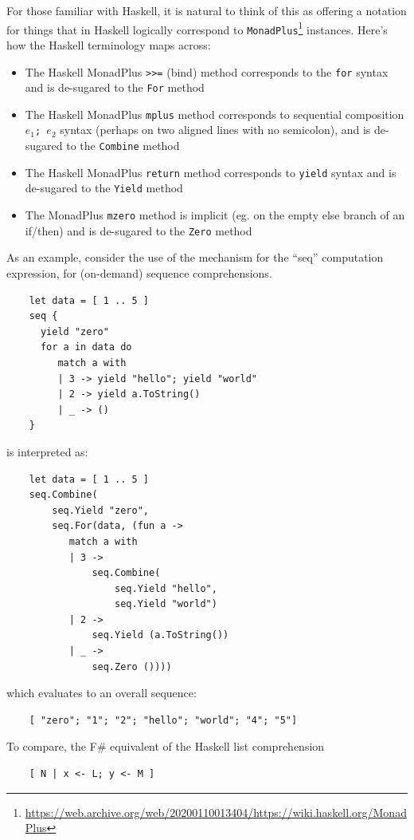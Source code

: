\documentclass[acmsmall]{acmart}\settopmatter{}
\begin{document}
For those familiar with Haskell, it is natural to think of this as offering a notation for things that in Haskell logically
correspond to \texttt{MonadPlus}\footnote{\url{https://web.archive.org/web/20200110013404/https://wiki.haskell.org/MonadPlus}} instances.  Here’s how the Haskell terminology maps across:
\begin{itemize}
\item The Haskell MonadPlus \texttt{>>=} (bind) method corresponds to the \texttt{for} syntax and is de-sugared to the \texttt{For} method

\item The Haskell MonadPlus \texttt{mplus} method corresponds to sequential composition \texttt{$e_1$; $e_2$} syntax (perhaps on two aligned lines with no semicolon), and is de-sugared to the \texttt{Combine} method

\item The Haskell MonadPlus \texttt{return} method corresponds to \texttt{yield} syntax and is de-sugared to the \texttt{Yield} method

\item The MonadPlus \texttt{mzero} method is implicit (eg. on the empty else branch of an if/then) and is de-sugared to the \texttt{Zero} method
\end{itemize}
As an example, consider the use of the mechanism for the “seq” computation expression, for (on-demand) sequence comprehensions. 
\begin{verbatim}
    let data = [ 1 .. 5 ]
    seq {
      yield "zero"
      for a in data do
         match a with
         | 3 -> yield "hello"; yield "world"
         | 2 -> yield a.ToString() 
         | _ -> () 
    }
\end{verbatim}
is interpreted as:
\begin{verbatim}
    let data = [ 1 .. 5 ]
    seq.Combine(
        seq.Yield "zero",
        seq.For(data, (fun a ->
           match a with
           | 3 -> 
               seq.Combine(
                   seq.Yield "hello", 
                   seq.Yield "world")
           | 2 ->
               seq.Yield (a.ToString())
           | _ ->
               seq.Zero ())))
\end{verbatim}
which evaluates to an overall sequence:
\begin{verbatim}
    [ "zero"; "1"; "2"; "hello"; "world"; "4"; "5"] 
\end{verbatim}
To compare, the F\# equivalent of the Haskell list comprehension
\begin{verbatim}
    [ N | x <- L; y <- M ]  
\end{verbatim}
\end{document}
